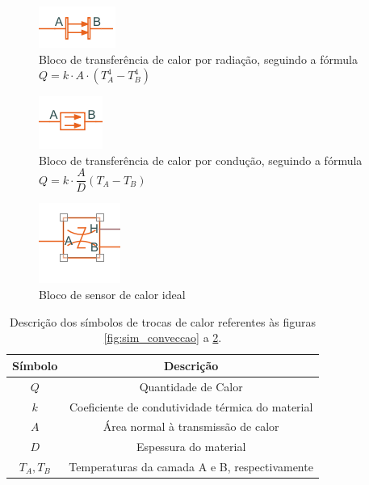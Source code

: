 \begin{figure}[H]
    \centering
    \includegraphics[scale=1.0]{figuras/projeto/controle/radiacao.png}
    \caption{Bloco de transferência de calor por radiação, seguindo a fórmula \(Q = k \cdot A \cdot (T_A^4 - T_B^4) \)}
    \label{fig:sim_radiacao}
\end{figure}

\begin{figure}[H]
    \centering
    \includegraphics[scale=1.0]{figuras/projeto/controle/conducao.png}
    \caption{Bloco de transferência de calor por condução, seguindo a fórmula \(Q = k \cdot \dfrac{A}{D} (T_A - T_B) \)}
    \label{fig:sim_conducao}
\end{figure}

\begin{figure}[H]
    \centering
    \includegraphics[scale=0.8]{figuras/projeto/controle/sensor_ideal.png}
    \caption{Bloco de sensor de calor ideal}
    \label{fig:sim_sensor}
\end{figure}

\begin{table}[H]
    \begin{center}
        \begin{tabular}{ |c|c| } 
            \hline
            Símbolo & Descrição \\
            \hline
            \(Q\) & Quantidade de Calor \\
            \hline
            \(k\) & Coeficiente de condutividade térmica do material \\
            \hline
            \(A\) & Área normal à transmissão de calor \\
            \hline
            \(D\) & Espessura do material \\
            \hline
            \(T_A, T_B\) & Temperaturas da camada A e B, respectivamente \\
            \hline
        \end{tabular}
        \caption{\label{tab:legenda_blocos} Descrição dos símbolos de trocas de calor referentes às figuras \ref{fig:sim_conveccao} a \ref{fig:sim_conducao}.}
    \end{center}
\end{table}


